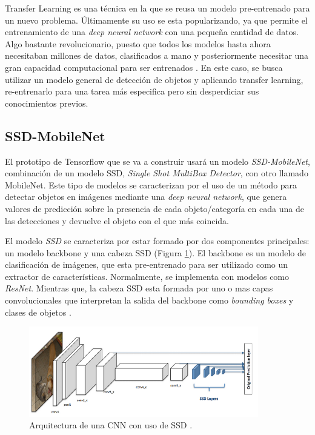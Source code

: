 Transfer Learning es una técnica en la que se reusa un modelo pre-entrenado para un nuevo problema. Últimamente su uso se esta popularizando, ya que permite el entrenamiento de una \textit{deep neural network} con una pequeña cantidad de datos. Algo bastante revolucionario, puesto que todos los modelos hasta ahora necesitaban millones de datos, clasificados a mano y posteriormente necesitar una gran capacidad computacional para ser entrenados \cite{transferLearning}. En este caso, se busca utilizar un modelo general de detección de objetos y aplicando transfer learning, re-entrenarlo para una tarea más especifica pero sin desperdiciar sus conocimientos previos.

\subsection*{SSD-MobileNet}

El prototipo de Tensorflow que se va a construir usará un modelo \textit{SSD-MobileNet}, combinación de un modelo SSD, \textit{Single Shot MultiBox Detector}, con otro llamado MobileNet. Este tipo de modelos se caracterizan por el uso de un método para detectar objetos en imágenes mediante una \textit{deep neural network}, que genera valores de predicción sobre la presencia de cada objeto/categoría en cada una de las detecciones y devuelve el objeto con el que más coincida.

El modelo \textit{SSD} se caracteriza por estar formado por dos componentes principales: un modelo backbone y una cabeza SSD (Figura \ref{fig:ssd}). El backbone es un modelo de clasificación de imágenes, que esta pre-entrenado para ser utilizado como un extractor de características. Normalmente, se implementa con modelos como \textit{ResNet}. Mientras que, la cabeza SSD esta formada por uno o mas capas convolucionales que interpretan la salida del backbone como \textit{bounding boxes} y clases de objetos \cite{ssdwork}. 

\begin{figure}[htp]
	\centering
	\includegraphics[width=10cm]{imagenes/cnnssd.png}
	\caption{Arquitectura de una CNN con uso de SSD \cite{ssdwork}.}
	\label{fig:ssd}
\end{figure}

